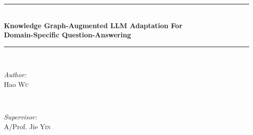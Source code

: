 \documentclass[a4paper,12pt]{article}
\theoremstyle{definition}
\begin{document}
    \begin{minipage}{\textwidth}

        \newcommand{\HRule}{\rule{\linewidth}{0.5mm}} %
        \center %
        \HRule \\[0.4cm]
        { \Large \bfseries Knowledge Graph-Augmented LLM Adaptation For\\\vspace{0.2cm} Domain-Specific Question-Answering}\\[0.4cm] %
        \HRule \\[1.5cm]
        \begin{minipage}{0.4\textwidth}
        \begin{flushleft} \large
        \emph{Author:}\\
        Hao \textsc{Wu}\\
        \end{flushleft}
        \end{minipage}
        ~
        \begin{minipage}{0.5\textwidth}
        \begin{flushright} \large
        \emph{Supervisor:} \\
        A/Prof. Jie \textsc{Yin}
        \end{flushright}
        \end{minipage}\\[3cm]
       
    \end{minipage}


    \setlength{\parindent}{0pt}
    \setlength{\parskip}{1em}
    
    
    
    
    
    


    \newpage
    \printbibliography
\end{document}
